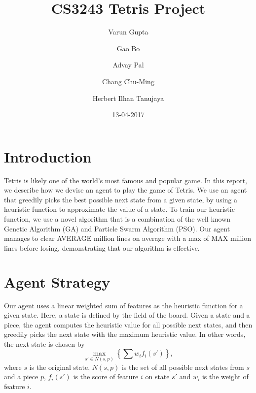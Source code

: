 \documentclass{article}
\title{CS3243 Tetris Project}
\author{Varun Gupta \and Gao Bo \and Advay Pal \and Chang Chu-Ming \and Herbert Ilhan Tanujaya}
\date{13-04-2017}
\begin{document}
\maketitle
\thispagestyle{empty}
\vspace{5mm}

\section{Introduction}
Tetris is likely one of the world's most famous and popular game. In this
report, we describe how we devise an agent to play the game of Tetris. We use
an agent that greedily picks the best possible next state from a given state,
by using a heuristic function to approximate the value of a state. To train our
heuristic function, we use a novel algorithm that is a combination of the well
known Genetic Algorithm (GA) and Particle Swarm Algorithm (PSO). Our agent
manages to clear AVERAGE million lines on average with a max of MAX million
lines before losing, demonstrating that our algorithm is effective.

\section{Agent Strategy}
Our agent uses a linear weighted sum of features as the heuristic function for
a given state. Here, a state is defined by the field of the board. Given a
state and a piece, the agent computes the heuristic value for all possible next
states, and then greedily picks the next state with the maximum heuristic
value. In other words, the next state is chosen by \[ \max_{s' \in N(s, p)}
\left\{ \sum w_i f_i(s') \right\}, \] where $s$ is the original state, $N(s,
p)$ is the set of all possible next states from $s$ and a piece $p$, $f_i(s')$
is the score of feature $i$ on state $s'$ and $w_i$ is the weight of feature
$i$.
\end{document}
